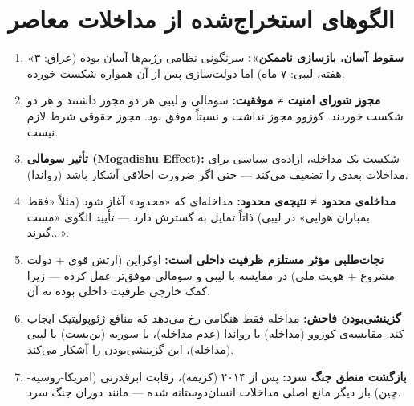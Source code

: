 \section{الگوهای استخراج‌شده از مداخلات معاصر}
\label{sec:ch10-patterns}

\begin{tcolorbox}[wavebox, title={الگوهای کلیدی مداخلات معاصر}]
\begin{enumerate}[nosep, label=\textbf{الگوی \arabic*:}]
  \item \textbf{«سقوط آسان، بازسازی ناممکن»:} سرنگونی نظامی رژیم‌ها آسان بوده (عراق: ۳ هفته، لیبی: ۷ ماه) اما دولت‌سازی پس از آن همواره شکست خورده.

  \item \textbf{مجوز شورای امنیت ≠ موفقیت:} سومالی و لیبی هر دو مجوز داشتند و هر دو شکست خوردند. کوزوو مجوز نداشت و نسبتاً موفق بود. مجوز حقوقی شرط لازم نیست.

  \item \textbf{تأثیر سومالی (Mogadishu Effect):} شکست یک مداخله، اراده‌ی سیاسی برای مداخلات بعدی را تضعیف می‌کند — حتی اگر ضرورت اخلاقی آشکار باشد (رواندا).

  \item \textbf{مداخله‌ی محدود ≠ نتیجه‌ی محدود:} مداخله‌ای که «محدود» آغاز شود (مثلاً «فقط بمباران هوایی» در لیبی) ذاتاً تمایل به گسترش دارد — تأیید الگوی «مست گیرند...».%

  \item \textbf{نجات‌طلبی مؤثر مستلزم ظرفیت داخلی است:} اوکراین (ارتش قوی + دولت مشروع + هویت ملی) در مقایسه با لیبی و سومالی موفق‌تر عمل کرده — زیرا کمک خارجی  ظرفیت داخلی بوده نه  آن.

  \item \textbf{گزینشی‌بودن فاحش:} مداخله فقط هنگامی رخ می‌دهد که منافع ژئوپولیتیک ایجاب کند. مقایسه‌ی کوزوو (مداخله) با رواندا (عدم مداخله)، یا سوریه (بن‌بست) با لیبی (مداخله)، این گزینشی‌بودن را آشکار می‌کند.

  \item \textbf{بازگشت منطق جنگ سرد:} پس از ۲۰۱۴ (کریمه)، رقابت ابرقدرتی (امریکا-روسیه-چین) بار دیگر مانع اصلی مداخلات انسان‌دوستانه شده — مانند دوران جنگ سرد.
\end{enumerate}
\end{tcolorbox}

